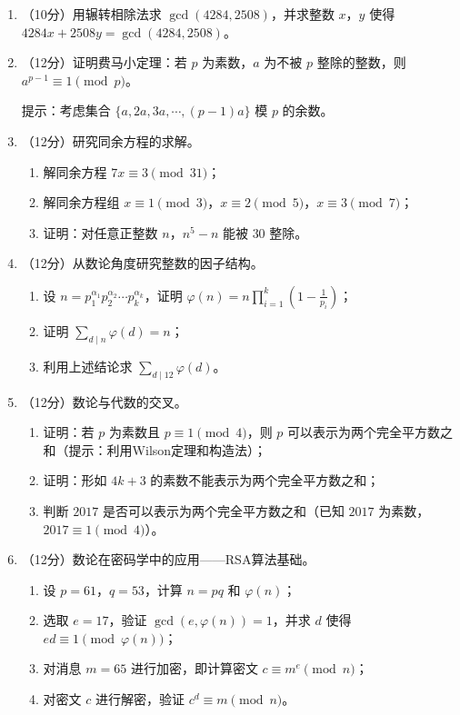 \documentclass[12pt, a4paper]{ctexart}
\begin{document}
\begin{enumerate}[resume]

\item （10分）用辗转相除法求 $\gcd(4284,2508)$，并求整数 $x$，$y$ 使得 $4284x+2508y=\gcd(4284,2508)$。

\item （12分）证明费马小定理：若 $p$ 为素数，$a$ 为不被 $p$ 整除的整数，则 $a^{p-1}\equiv 1\pmod{p}$。

提示：考虑集合 $\{a,2a,3a,\cdots,(p-1)a\}$ 模 $p$ 的余数。

\item （12分）研究同余方程的求解。

\begin{enumerate}[label=(\arabic*)]
    \item 解同余方程 $7x\equiv 3\pmod{31}$；
    \item 解同余方程组 $x\equiv 1\pmod{3}$，$x\equiv 2\pmod{5}$，$x\equiv 3\pmod{7}$；
    \item 证明：对任意正整数 $n$，$n^5-n$ 能被 $30$ 整除。
\end{enumerate}

\item （12分）从数论角度研究整数的因子结构。

\begin{enumerate}[label=(\arabic*)]
    \item 设 $n=p_1^{\alpha_1}p_2^{\alpha_2}\cdots p_k^{\alpha_k}$，证明 $\varphi(n)=n\displaystyle\prod_{i=1}^{k}\left(1-\frac{1}{p_i}\right)$；
    \item 证明 $\displaystyle\sum_{d\mid n}\varphi(d)=n$；
    \item 利用上述结论求 $\displaystyle\sum_{d\mid 12}\varphi(d)$。
\end{enumerate}

\item （12分）数论与代数的交叉。

\begin{enumerate}[label=(\arabic*)]
    \item 证明：若 $p$ 为素数且 $p\equiv 1\pmod{4}$，则 $p$ 可以表示为两个完全平方数之和（提示：利用Wilson定理和构造法）；
    \item 证明：形如 $4k+3$ 的素数不能表示为两个完全平方数之和；
    \item 判断 $2017$ 是否可以表示为两个完全平方数之和（已知 $2017$ 为素数，$2017\equiv 1\pmod{4}$）。
\end{enumerate}

\item （12分）数论在密码学中的应用——RSA算法基础。

\begin{enumerate}[label=(\arabic*)]
    \item 设 $p=61$，$q=53$，计算 $n=pq$ 和 $\varphi(n)$；
    \item 选取 $e=17$，验证 $\gcd(e,\varphi(n))=1$，并求 $d$ 使得 $ed\equiv 1\pmod{\varphi(n)}$；
    \item 对消息 $m=65$ 进行加密，即计算密文 $c\equiv m^e\pmod{n}$；
    \item 对密文 $c$ 进行解密，验证 $c^d\equiv m\pmod{n}$。
\end{enumerate}

\end{enumerate}
\end{document}
